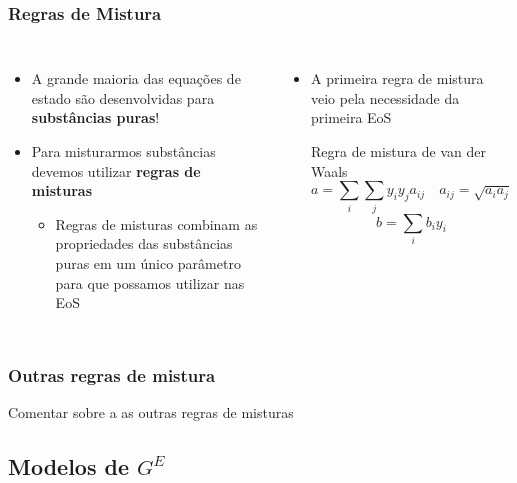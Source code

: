 \documentclass[aspectratio=169]{beamer}
\begin{document}
\begin{frame}
	\frametitle{Regras de Mistura}
	\begin{columns}[c]
		\begin{itemize}
			\item A grande maioria das equações de estado são desenvolvidas para
			\textbf{substâncias puras}!
			\item Para misturarmos substâncias devemos utilizar \textbf{regras de
			misturas}
			\pause
			\begin{itemize}
				\item Regras de misturas combinam as propriedades das substâncias puras em
				um único parâmetro para que possamos utilizar nas EoS	
			\end{itemize}
		\end{itemize}
		\pause
		\begin{itemize}
			\item A primeira regra de mistura veio pela necessidade da primeira EoS
			\begin{block}{Regra de mistura de van der Waals}
			\begin{equation*}
			a = \sum_i\sum_j{y_iy_ja_{ij}} \quad a_{ij}= \sqrt{a_i a_j}
			\end{equation*}
			\begin{equation*}
			b = \sum_i{b_iy_i}
			\end{equation*}
			\end{block}
		\end{itemize}
	\end{columns}
\end{frame}

\begin{frame}
	\frametitle{Outras regras de mistura}
	Comentar sobre a as outras regras de misturas
\end{frame}

\subsection{Modelos de $G^E$}
\end{document}
